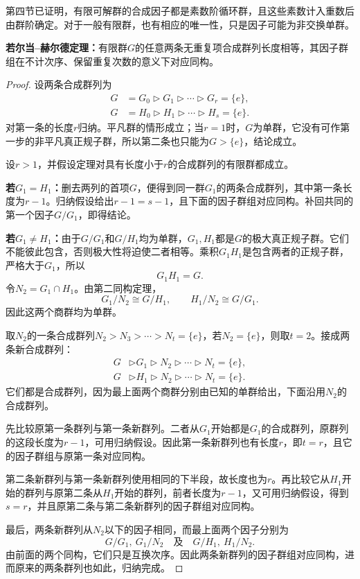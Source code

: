 第四节已证明，有限可解群的合成因子都是素数阶循环群，且这些素数计入重数后由群阶确定。对于一般有限群，也有相应的唯一性，只是因子可能为非交换单群。

\begin{theorem}\label{p2:jordan-holder}
\textbf{若尔当--赫尔德定理：}有限群$G$的任意两条无重复项合成群列长度相等，其因子群组在不计次序、保留重复次数的意义下对应同构。
\end{theorem}
\begin{proof}
设两条合成群列为
\begin{align*}
G&=G_0\triangleright G_1\triangleright\cdots\triangleright G_r=\{e\},\\
G&=H_0\triangleright H_1\triangleright\cdots\triangleright H_s=\{e\}.
\end{align*}
对第一条的长度$r$归纳。平凡群的情形成立；当$r=1$时，$G$为单群，它没有可作第一步的非平凡真正规子群，所以第二条也只能为$G>\{e\}$，结论成立。

设$r>1$，并假设定理对具有长度小于$r$的合成群列的有限群都成立。

\textbf{若$G_1=H_1$：}删去两列的首项$G$，便得到同一群$G_1$的两条合成群列，其中第一条长度为$r-1$。归纳假设给出$r-1=s-1$，且下面的因子群组对应同构。补回共同的第一个因子$G/G_1$，即得结论。

\textbf{若$G_1\ne H_1$：}由于$G/G_1$和$G/H_1$均为单群，$G_1,H_1$都是$G$的极大真正规子群。它们不能彼此包含，否则极大性将迫使二者相等。乘积$G_1H_1$是包含两者的正规子群，严格大于$G_1$，所以
\[
G_1H_1=G.
\]
令$N_2=G_1\cap H_1$。由第二同构定理，
\[
G_1/N_2\cong G/H_1,\qquad
H_1/N_2\cong G/G_1.
\]
因此这两个商群均为单群。

取$N_2$的一条合成群列$N_2>N_3>\cdots>N_t=\{e\}$，若$N_2=\{e\}$，则取$t=2$。接成两条新合成群列：
\begin{align*}
G&\triangleright G_1\triangleright N_2\triangleright\cdots\triangleright N_t=\{e\},\\
G&\triangleright H_1\triangleright N_2\triangleright\cdots\triangleright N_t=\{e\}.
\end{align*}
它们都是合成群列，因为最上面两个商群分别由已知的单群给出，下面沿用$N_2$的合成群列。

先比较原第一条群列与第一条新群列。二者从$G_1$开始都是$G_1$的合成群列，原群列的这段长度为$r-1$，可用归纳假设。因此第一条新群列也有长度$r$，即$t=r$，且它的因子群组与原第一条对应同构。

第二条新群列与第一条新群列使用相同的下半段，故长度也为$r$。再比较它从$H_1$开始的群列与原第二条从$H_1$开始的群列，前者长度为$r-1$，又可用归纳假设，得到$s=r$，并且原第二条与第二条新群列的因子群组对应同构。

最后，两条新群列从$N_2$以下的因子相同，而最上面两个因子分别为
\[
G/G_1,\ G_1/N_2
\quad\text{及}\quad
G/H_1,\ H_1/N_2.
\]
由前面的两个同构，它们只是互换次序。因此两条新群列的因子群组对应同构，进而原来的两条群列也如此，归纳完成。
\end{proof}


